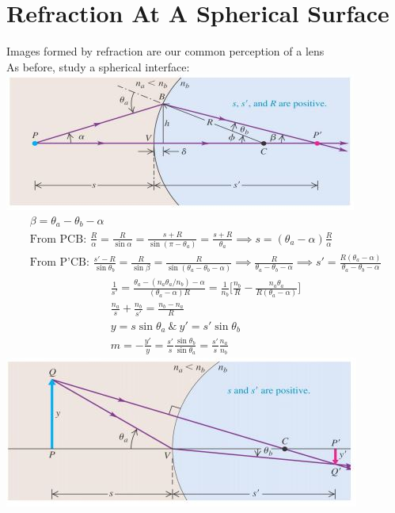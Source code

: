 \documentclass[a4paper, 11pt, fleqn, normalem]{report}
\begin{document}
\section{Refraction At A Spherical Surface}
Images formed by refraction are our common perception of a lens \\
As before, study a spherical interface: \\
\includegraphics{Refrac4.jpg}
\begin{gather*}
    \beta = \theta_{a} - \theta_{b} - \alpha \\
    \text{From PCB: }\frac{R}{\alpha} = \frac{R}{\sin{\alpha}} = \frac{s + R}{\sin{(\pi - \theta_{a})}} = \frac{s + R}{\theta_{a}} \implies s = (\theta_{a} - \alpha)\frac{R}{\alpha} \\
    \text{From P'CB: }\frac{s' - R}{\sin{\theta_{b}}} = \frac{R}{\sin{\beta}} = \frac{R}{\sin{(\theta_{a} - \theta_{b} - \alpha)}} \implies \frac{R}{\theta_{a} - \theta_{b} - \alpha} \implies s' = \frac{R(\theta_{a} - \alpha)}{\theta_{a} - \theta_{b} - \alpha}
\end{gather*}
\begin{gather*}
    \frac{1}{s'} = \frac{\theta_{a} - (n_{a}\theta_{a}/n_{b}) - \alpha}{(\theta_{a} - \alpha)R} = \frac{1}{n_{b}}\Big[\frac{n_{b}}{R} - \frac{n_{a}\theta_{a}}{R(\theta_{a} - \alpha)}\Big] \\
    \frac{n_{a}}{s} + \frac{n_{b}}{s'} = \frac{n_{b} - n_{a}}{R} \\
    y = s\sin{\theta_{a}} ~\&~ y' = s'\sin{\theta_{b}} \\
    m = -\frac{y'}{y} = \frac{s'}{s}\frac{\sin{\theta_{b}}}{\sin{\theta_{a}}} = \frac{s'}{s}\frac{n_{a}}{n_{b}}
\end{gather*}
\includegraphics{Refrac5.jpg}
\end{document}
